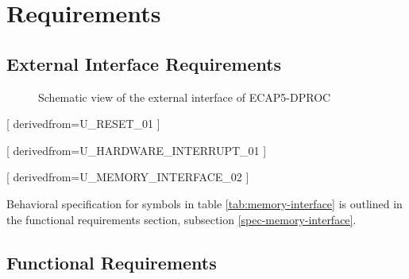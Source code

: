 \section{Requirements}

\subsection{External Interface Requirements}

\begin{figure}[h!]
    \centering
    
    \caption{Schematic view of the external interface of ECAP5-DPROC}
    \label{fig:externalinterface}
\end{figure}

\begin{table}[H]
  \centering
  
  \caption{ECAP5-DPROC control signals}
  \label{tab:control-interface}
\end{table}

\begin{table}[H]
  \centering
  
  \caption{ECAP5-DPROC memory interface signals}
  \label{tab:memory-interface}
\end{table}


[
  derivedfrom=U\_RESET\_01
]


[
  derivedfrom=U\_HARDWARE\_INTERRUPT\_01
]


[
  derivedfrom=U\_MEMORY\_INTERFACE\_02
]

\begin{content}
  Behavioral specification for symbols in table \ref{tab:memory-interface} is outlined in the functional requirements section, subsection \ref{spec-memory-interface}.
\end{content}

\subsection{Functional Requirements}

